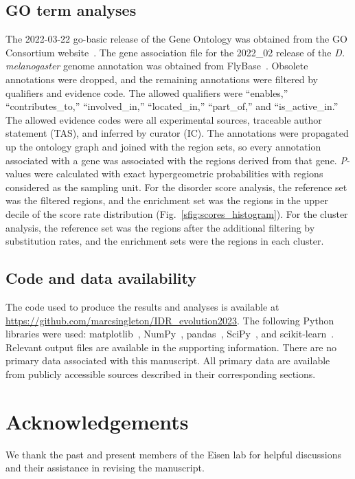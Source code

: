 \subsection{GO term analyses}
The 2022-03-22 go-basic release of the Gene Ontology was obtained from the GO Consortium website~\cite{Ashburner2000, 2020GOConsortium}. The gene association file for the 2022\_02 release of the \textit{D. melanogaster} genome annotation was obtained from FlyBase~\cite{Gramates2022}. Obsolete annotations were dropped, and the remaining annotations were filtered by qualifiers and evidence code. The allowed qualifiers were ``enables,'' ``contributes\_to,'' ``involved\_in,'' ``located\_in,'' ``part\_of,'' and ``is\_active\_in.'' The allowed evidence codes were all experimental sources, traceable author statement (TAS), and inferred by curator (IC). The annotations were propagated up the ontology graph and joined with the region sets, so every annotation associated with a gene was associated with the regions derived from that gene. \textit{P}-values were calculated with exact hypergeometric probabilities with regions considered as the sampling unit. For the disorder score analysis, the reference set was the filtered regions, and the enrichment set was the regions in the upper decile of the score rate distribution (Fig.~\ref{sfig:scores_histogram}). For the cluster analysis, the reference set was the regions after the additional filtering by substitution rates, and the enrichment sets were the regions in each cluster.

\subsection{Code and data availability}
\begin{sloppypar}
The code used to produce the results and analyses is available at \url{https://github.com/marcsingleton/IDR_evolution2023}. The following Python libraries were used: matplotlib~\cite{Hunter2007}, NumPy~\cite{Harris2020}, pandas~\cite{McKinney2010}, SciPy~\cite{Virtanen2020}, and scikit-learn~\cite{Pedregosa2011}. Relevant output files are available in the supporting information. There are no primary data associated with this manuscript. All primary data are available from publicly accessible sources described in their corresponding sections.
\end{sloppypar}

\section{Acknowledgements}
We thank the past and present members of the Eisen lab for helpful discussions and their assistance in revising the manuscript.

